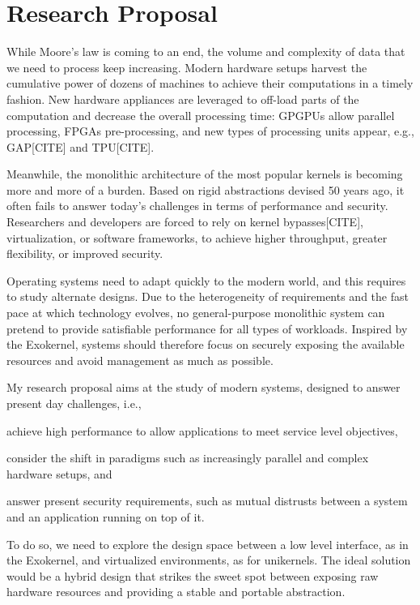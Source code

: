 \section{Research Proposal}

While Moore's law is coming to an end, the volume and complexity of data that we need to process keep increasing.
Modern hardware setups harvest the cumulative power of dozens of machines to achieve their computations in a timely fashion.
New hardware appliances are leveraged to off-load parts of the computation and decrease the overall processing time: GPGPUs allow parallel processing, FPGAs pre-processing, and new types of processing units appear, e.g., GAP[CITE] and TPU[CITE].

Meanwhile, the monolithic architecture of the most popular kernels is becoming more and more of a burden.
Based on rigid abstractions devised 50 years ago, it often fails to answer today's challenges in terms of performance and security.
Researchers and developers are forced to rely on kernel bypasses[CITE], virtualization, or software frameworks, to achieve higher throughput, greater flexibility, or improved security.

Operating systems need to adapt quickly to the modern world, and this requires to study alternate designs.
Due to the heterogeneity of requirements and the fast pace at which technology evolves, no general-purpose monolithic system can pretend to provide satisfiable performance for all types of workloads.
Inspired by the Exokernel, systems should therefore focus on securely exposing the available resources and avoid management as much as possible.

My research proposal aims at the study of modern systems, designed to answer present day challenges, i.e.,
\begin{enumerate*}
	\item achieve high performance to allow applications to meet service level objectives,
	\item consider the shift in paradigms such as increasingly parallel and complex hardware setups, and
	\item answer present security requirements, such as mutual distrusts between a system and an application running on top of it.
\end{enumerate*}
To do so, we need to explore the design space between a low level interface, as in the Exokernel, and virtualized environments, as for unikernels.
The ideal solution would be a hybrid design that strikes the sweet spot between exposing raw hardware resources and providing a stable and portable abstraction.

